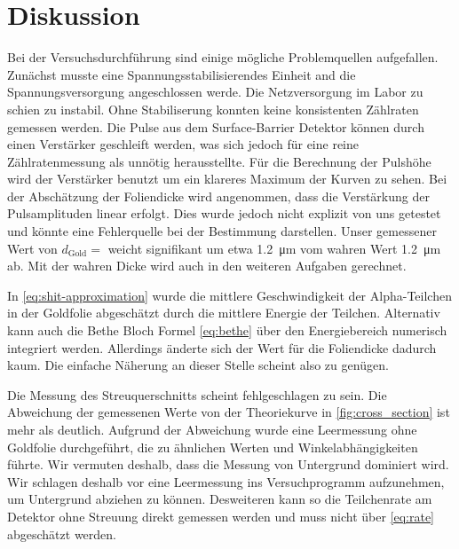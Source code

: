 \section{Diskussion}

Bei der Versuchsdurchführung sind einige mögliche Problemquellen aufgefallen.
Zunächst musste eine Spannungsstabilisierendes Einheit and die Spannungsversorgung angeschlossen werde.
Die Netzversorgung im Labor zu schien zu instabil. Ohne Stabiliserung konnten keine konsistenten Zählraten gemessen werden.
Die Pulse aus dem Surface-Barrier Detektor können durch einen Verstärker geschleift werden, was sich jedoch für eine reine Zählratenmessung
als unnötig herausstellte.
Für die Berechnung der Pulshöhe wird der Verstärker benutzt um ein klareres Maximum der Kurven zu sehen.
Bei der Abschätzung der Foliendicke wird angenommen, dass die Verstärkung der Pulsamplituden linear erfolgt.
Dies wurde jedoch nicht explizit von uns getestet und könnte eine Fehlerquelle bei der Bestimmung darstellen.
Unser gemessener Wert von $d_\text{Gold} = $ weicht signifikant um etwa \SI{1.2}{\micro\meter} vom wahren Wert \SI{1.2}{\micro\meter} ab.
Mit der wahren Dicke wird auch in den weiteren Aufgaben gerechnet.

In \eqref{eq:shit-approximation} wurde die mittlere Geschwindigkeit der Alpha-Teilchen in der Goldfolie abgeschätzt durch die mittlere Energie der Teilchen.
Alternativ kann auch die Bethe Bloch Formel \eqref{eq:bethe} über den Energiebereich numerisch integriert werden.
Allerdings änderte sich der Wert für die Foliendicke dadurch kaum. Die einfache Näherung an dieser Stelle scheint also zu genügen.


Die Messung des Streuquerschnitts scheint fehlgeschlagen zu sein. Die Abweichung der gemessenen Werte von der Theoriekurve in \autoref{fig:cross_section} ist mehr als deutlich.
Aufgrund der Abweichung wurde eine Leermessung ohne Goldfolie durchgeführt, die zu ähnlichen Werten und Winkelabhängigkeiten führte.
Wir vermuten deshalb, dass  die Messung von Untergrund dominiert wird.
Wir schlagen deshalb vor eine Leermessung ins Versuchprogramm aufzunehmen, um Untergrund abziehen zu können.
Desweiteren kann so die Teilchenrate am Detektor ohne Streuung direkt gemessen werden und muss nicht über \eqref{eq:rate} abgeschätzt werden.
